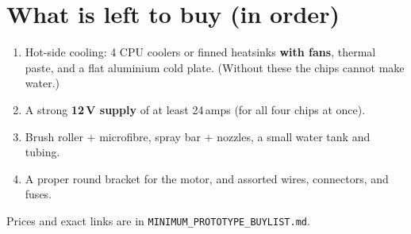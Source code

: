 \documentclass[11pt,a4paper]{article}
\begin{document}
\section{What is left to buy (in order)}

\begin{enumerate}[leftmargin=*,itemsep=1pt]
  \item Hot-side cooling: 4 CPU coolers or finned heatsinks \textbf{with fans}, thermal paste, and a flat
  aluminium cold plate. (Without these the chips cannot make water.)
  \item A strong \textbf{12\,V supply} of at least 24\,amps (for all four chips at once).
  \item Brush roller + microfibre, spray bar + nozzles, a small water tank and tubing.
  \item A proper round bracket for the motor, and assorted wires, connectors, and fuses.
\end{enumerate}
\noindent Prices and exact links are in \texttt{MINIMUM\_PROTOTYPE\_BUYLIST.md}.

\vspace{0.3cm}
\noindent{}
\end{document}
